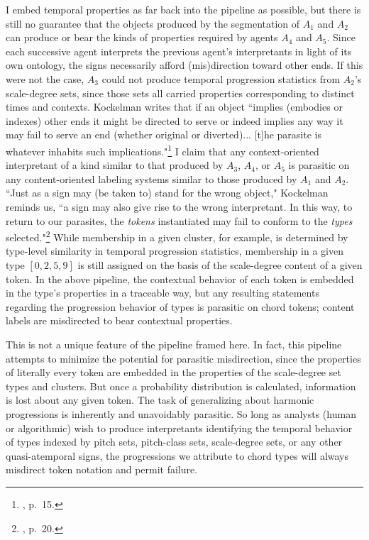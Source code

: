 I embed temporal properties as far back into the pipeline as possible, but there is still no guarantee that the objects produced by the segmentation of $A_1$ and $A_2$ can produce or bear the kinds of properties required by agents $A_4$ and $A_5$.  Since each successive agent interprets the previous agent's interpretants in light of its own ontology, the signs necessarily afford (mis)direction toward other ends.  If this were not the case, $A_3$ could not produce temporal progression statistics from $A_2$'s scale-degree sets, since those sets all carried properties corresponding to distinct times and contexts.  Kockelman writes that if an object ``implies (embodies or indexes) other ends it might be directed to serve or indeed implies any way it may fail to serve an end (whether original or diverted)... [t]he parasite is whatever inhabits such implications."\footnote{\cite{kockelman2013}, p.\ 15.}  I claim that any context-oriented interpretant of a kind similar to that produced by $A_3$, $A_4$, or $A_5$ is parasitic on any content-oriented labeling systems similar to those produced by $A_1$ and $A_2$.  ``Just as a sign may (be taken to) stand for the wrong object," Kockelman reminds us, ``a  sign may also give rise to the wrong interpretant.  In this way, to return to our parasites, the \emph{tokens} instantiated may fail to conform to the \emph{types} selected."\footnote{\cite{kockelman2013}, p.\ 20.}  While membership in a given cluster, for example, is determined by type-level similarity in temporal progression statistics, membership in a given type $[0,2,5,9]$ is still assigned on the basis of the scale-degree content of a given token.  In the above pipeline, the contextual behavior of each token is embedded in the type's properties in a traceable way, but any resulting statements regarding the progression behavior of types is parasitic on chord tokens; content labels are misdirected to bear contextual properties.

This is not a unique feature of the pipeline framed here.  In fact, this pipeline attempts to minimize the potential for parasitic misdirection, since the properties of literally every token are embedded in the properties of the scale-degree set types and clusters.  But once a probability distribution is calculated, information is lost about any given token.  The task of generalizing about harmonic progressions is inherently and unavoidably parasitic. So long as analysts (human or algorithmic) wish to produce interpretants identifying the temporal behavior of types indexed by pitch sets, pitch-class sets, scale-degree sets, or any other quasi-atemporal signs, the progressions we attribute to chord types will always misdirect token notation and permit failure.

